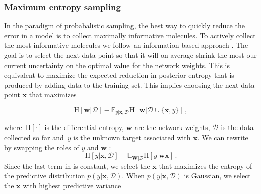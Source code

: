 \subsubsection{Maximum entropy sampling}

In the paradigm of probabalistic sampling, the best way to quickly reduce the error in a model is to collect maximally informative molecules. To actively collect the most informative molecules we follow an information-based approach \cite{MacKay_1992}. The goal
is to select the next data point so that it will on average shrink the most our current uncertainty on the optimal value for the network weights. This is equivalent to maximize the expected reduction in posterior entropy that is produced by adding data to the training set. This implies choosing the next data point $\mathbf{x}$ that maximizes

\begin{equation}
\text{H}[\mathbf{w}|\mathcal{D}] - 
\mathbb{E}_{y|\mathbf{x},\mathcal{D}}\text{H}[\mathbf{w}|\mathcal{D}\cup\{\mathbf{x},y\}]\,,\label{eq:acq_func}
\end{equation}

where~$\text{H}[\cdot]$ is the differential entropy, $\mathbf{w}$ are the network weights, $\mathcal{D}$ is the data collected so far and~$y$ is the unknown target associated with $\mathbf{x}$. We can rewrite  by swapping the roles of $y$ and $\mathbf{w}$ \cite{houlsby2012collaborative}:
\begin{equation}
\text{H}[y | \mathbf{x},\mathcal{D}] - 
\mathbb{E}_{\mathbf{W} | \mathcal{D}}\text{H}[y | \mathbf{w}\mathbf{x}]\,.\label{eq:new_acquisition_function}
\end{equation}
Since the last term in is constant, we select the $\mathbf{x}$ that maximizes the entropy of the predictive distribution $p(y| \mathbf{x},\mathcal{D})$. When $p(y| \mathbf{x},\mathcal{D})$ is Gaussian, we select the $\mathbf{x}$ with highest predictive variance